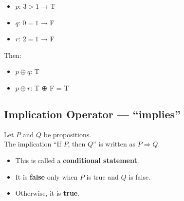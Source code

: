 \documentclass[
]{book}
\providecommand{\tightlist}{%
  \setlength{\itemsep}{0pt}\setlength{\parskip}{0pt}}
\theoremstyle{definition}
\theoremstyle{definition}
\theoremstyle{definition}
\theoremstyle{definition}
\theoremstyle{remark}
\begin{document}
\begin{itemize}
\tightlist
\item
  \(p\): \(3 > 1\) → T\\
\item
  \(q\): \(0 = 1\) → F\\
\item
  \(r\): \(2 = 1\) → F
\end{itemize}

Then:

\begin{itemize}
\tightlist
\item
  \(p \oplus q\): T\\
\item
  \(p \oplus r\): T ⊕ F = T
\end{itemize}

\subsection{Implication Operator --- ``implies''}\label{implication-operator-implies}

Let \(P\) and \(Q\) be propositions.\\
The implication ``If \(P\), then \(Q\)'' is written as \(P \Rightarrow Q\).

\begin{itemize}
\tightlist
\item
  This is called a \textbf{conditional statement}.
\item
  It is \textbf{false} only when \(P\) is true and \(Q\) is false.
\item
  Otherwise, it is \textbf{true}.
\end{itemize}
\end{document}
